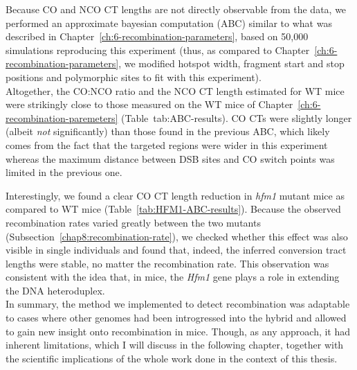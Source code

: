 Because CO and NCO CT lengths are not directly observable from the data, we performed an approximate bayesian computation (ABC) similar to what was described in Chapter~\ref{ch:6-recombination-parameters}, based on 50,000 simulations reproducing this experiment (thus, as compared to Chapter~\ref{ch:6-recombination-parameters}, we modified hotspot width, fragment start and stop positions and polymorphic sites to fit with this experiment).\\




Altogether, the CO:NCO ratio and the NCO CT length estimated for WT mice were strikingly close to those measured on the WT mice of Chapter~\ref{ch:6-recombination-paremeters} (Table~{tab:ABC-results}).
CO CTs were slightly longer (albeit \textit{not} significantly) than those found in the previous ABC, which likely comes from the fact that the targeted regions were wider in this experiment whereas the maximum distance between DSB sites and CO switch points was limited in the previous one.

Interestingly, we found a clear CO CT length reduction in \textit{hfm1} mutant mice as compared to WT mice (Table~\ref{tab:HFM1-ABC-results}).
Because the observed recombination rates varied greatly between the two mutants (Subsection~\ref{chap8:recombination-rate}), we checked whether this effect was also visible in single individuals and found that, indeed, the inferred conversion tract lengths were stable, no matter the recombination rate.
This observation was consistent with the idea that, in mice, the \textit{Hfm1} gene plays a role in extending the DNA heteroduplex.\\


In summary, the method we implemented to detect recombination was adaptable to cases where other genomes had been introgressed into the hybrid and allowed to gain new insight onto recombination in mice.
Though, as any approach, it had inherent limitations, which I will discuss in the following chapter, together with the scientific implications of the whole work done in the context of this thesis.



